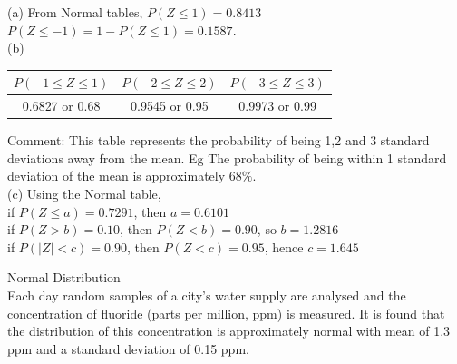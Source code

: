 \documentclass[bigtut]{tutorial}\usepackage[]{graphicx}\usepackage[]{color}
\begin{document}
\begin{tutorial}
\begin{questions}
\begin{solution}
(a) From Normal tables,
$P(Z \leq 1) = 0.8413$ \\
$P(Z \leq -1) = 1- P(Z \leq 1) = 0.1587$. \\

(b)
\begin{tabular}{| c | c | c |} \hline
$P( -1 \leq Z \leq 1)$ & $P( -2 \leq Z \leq 2)$ & $P( -3 \leq Z \leq 3)$ \\ \hline
0.6827 or 0.68 & 0.9545 or 0.95 & 0.9973  or 0.99 \\ \hline
\end{tabular}

 \vspace{.5cm}
Comment: This table represents the probability of being 1,2 and 3 standard deviations away from the mean. 
Eg The probability of being within 1 standard deviation of the mean is approximately $68 \%$. \\

(c) 
Using the Normal table, \\
if $P(Z \leq a) = 0.7291$, then  $a = 0.6101$ \\
if $P(Z > b) = 0.10$, then $P(Z < b) = 0.90$, so $b = 1.2816$ \\
if $P(|Z| <c) = 0.90$, then $P(Z <c)=0.95$, hence
$c =  1.645$ \\
\end{solution}


\question Normal Distribution \\

Each day random samples of a city's water supply are analysed and the concentration of fluoride (parts per million, ppm) is measured. It is found that the distribution of this concentration is approximately normal with mean of 1.3 ppm and a standard deviation of 0.15 ppm. \\





\end{questions}
\end{tutorial}
\end{document}
